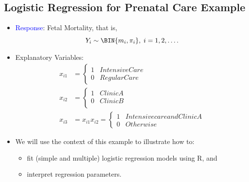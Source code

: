\documentclass{article}\usepackage[]{graphicx}\usepackage[svgnames]{xcolor}
\begin{document}
\subsection*{Logistic Regression for Prenatal Care Example}
\begin{itemize}
      \item \textcolor{Blue}{Response}: Fetal Mortality, that is,
            \[ Y_i \sim \BIN{m_i,\pi_i},\; i=1,2,\ldots. \]
      \item Explanatory Variables:
            \begin{align*}
                  x_{i1} & =\begin{cases*}
                                  1 & Intensive Care \\
                                  0 & Regular Care
                            \end{cases*}                           \\
                  x_{i2} & =\begin{cases*}
                                  1 & Clinic A \\
                                  0 & Clinic B \\
                            \end{cases*}                                \\
                  x_{i3} & =x_{i1}x_{i2}=\begin{cases*}
                                               1 & Intensive care and Clinic A \\
                                               0 & Otherwise
                                         \end{cases*}
            \end{align*}
      \item We will use the context of this example to illustrate how to:
            \begin{itemize}
                  \item fit (simple and multiple) logistic regression models using R, and
                  \item interpret regression parameters.
            \end{itemize}
\end{itemize}
\end{document}

